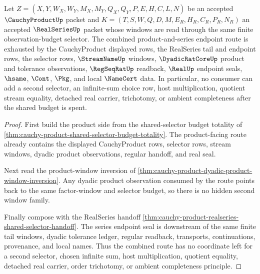 \begin{theorem}
\label{thm:cauchy-product-real-series-budget-exhaustion}
Let $Z=(X,Y,W_X,W_Y,M_X,M_Y,Q_X,Q_Y,P,E,H,C,L,N)$ be an accepted $\CauchyProductUp$ packet and $K=(T,S,W,Q,D,M,E_R,H_R,C_R,P_R,N_R)$ an accepted $\RealSeriesUp$ packet whose windows are read through the same finite observation-budget selector. The combined product-and-series endpoint route is exhausted by the CauchyProduct displayed rows, the RealSeries tail and endpoint rows, the selector rows, $\StreamNameUp$ windows, $\DyadicRatCoreUp$ product and tolerance observations, $\RegSeqRatUp$ readback, $\RealUp$ endpoint seals, $\hsame$, $\Cont$, $\Pkg$, and local $\NameCert$ data. In particular, no consumer can add a second selector, an infinite-sum choice row, host multiplication, quotient stream equality, detached real carrier, trichotomy, or ambient completeness after the shared budget is spent.
\end{theorem}
\begin{proof}
First build the product side from the shared-selector budget totality of \autoref{thm:cauchy-product-shared-selector-budget-totality}. The product-facing route already contains the displayed CauchyProduct rows, selector rows, stream windows, dyadic product observations, regular handoff, and real seal.

Next read the product-window inversion of \autoref{thm:cauchy-product-dyadic-product-window-inversion}. Any dyadic product observation consumed by the route points back to the same factor-window and selector budget, so there is no hidden second window family.

Finally compose with the RealSeries handoff \autoref{thm:cauchy-product-realseries-shared-selector-handoff}. The series endpoint seal is downstream of the same finite tail windows, dyadic tolerance ledger, regular readback, transports, continuations, provenance, and local names. Thus the combined route has no coordinate left for a second selector, chosen infinite sum, host multiplication, quotient equality, detached real carrier, order trichotomy, or ambient completeness principle.
\end{proof}


